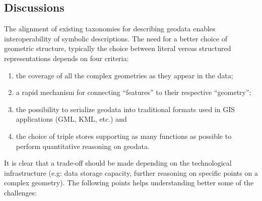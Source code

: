 \subsection{Discussions}
The alignment of existing taxonomies for describing geodata enables interoperability of symbolic descriptions. The need for a better choice of geometric structure, typically the choice between literal versus structured representations depends on four criteria: 
\begin{enumerate}
\item  the coverage of all the complex geometries as they appear in the data;
\item  a rapid mechanism for connecting ``features'' to their respective ``geometry'';
\item the possibility to serialize geodata into traditional formats used in GIS applications (GML, KML, etc.) and
\item the choice of triple stores supporting as many functions as possible  to perform quantitative reasoning on geodata.
\end{enumerate}
    
    It is clear that a trade-off should be made depending on the technological infrastructure (e.g: data storage capacity, further reasoning on specific points on a complex geometry). The following points helps understanding better some of the challenges: 

